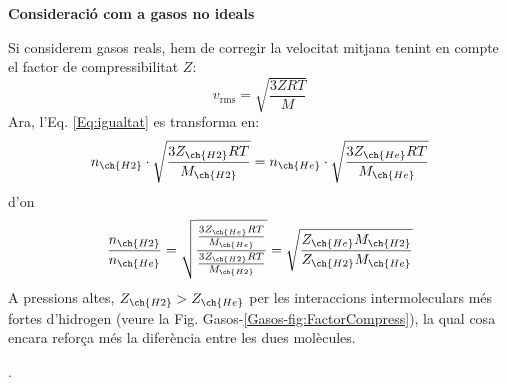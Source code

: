 {%
\textbf{Consideració com a gasos no ideals}

Si considerem gasos reals, hem de corregir la velocitat mitjana tenint en compte el factor de compressibilitat $Z$:
\begin{equation}
    v_{\text{rms}} = \sqrt{\frac{3ZRT}{M}}
\end{equation}
Ara, l'Eq. \ref{Eq:igualtat} es transforma en:
\[
    n_{\ch{H2}} \cdot \sqrt{\frac{3Z_{\ch{H2}}RT}{M_{\ch{H2}}}} = n_{\ch{He}} \cdot \sqrt{\frac{3Z_{\ch{He}}RT}{M_{\ch{He}}}}
\]
d'on
\[
    \frac{n_{\ch{H2}}}{n_{\ch{He}}}=\sqrt{\frac{\frac{3Z_{\ch{He}}RT}{M_{\ch{He}}}}{\frac{3Z_{\ch{H2}}RT}{M_{\ch{H2}}}}}
    =\sqrt{\frac{Z_{\ch{He}}M_{\ch{H2}}}{Z_{\ch{H2}}M_{\ch{He}}}}
\]
A pressions altes, $Z_{\ch{H2}} > Z_{\ch{He}}$ per les interaccions intermoleculars més fortes d'hidrogen (veure la Fig. Gasos-\ref{Gasos-fig:FactorCompress}), la qual cosa encara reforça més la diferència entre les dues molècules. 

.
}

